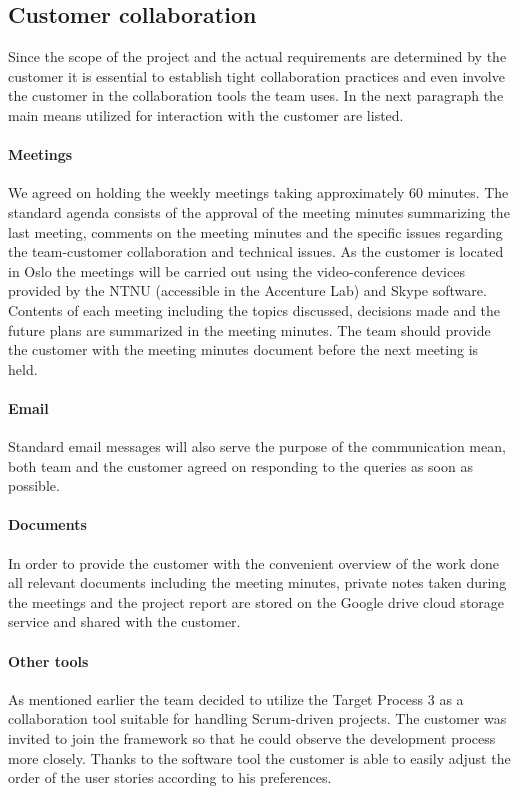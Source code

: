 \documentclass{article}
\begin{document}
\subsection{Customer collaboration}
Since the scope of the project and the actual requirements are determined by the customer it is essential to establish tight collaboration practices and even involve the customer in the collaboration tools the team uses. In the next paragraph the main means utilized for interaction with the customer are listed. 

\paragraph{Meetings}
We agreed on holding the weekly meetings taking approximately 60 minutes. The standard agenda consists of the approval of the meeting minutes summarizing the last meeting, comments on the meeting minutes and the specific issues regarding the team-customer collaboration and technical issues. As the customer is located in Oslo the meetings will be carried out using the video-conference devices provided by the NTNU (accessible in the Accenture Lab) and Skype software. Contents of each meeting including the topics discussed, decisions made and the future plans are summarized in the meeting minutes. The team should provide the customer with the meeting minutes document before the next meeting is held.

\paragraph{Email}
Standard email messages will also serve the purpose of the communication mean, both team and the customer agreed on responding to the queries as soon as possible.

\paragraph{Documents}
In order to provide the customer with the convenient overview of the work done all relevant documents including the meeting minutes, private notes taken during the meetings and the project report are stored on the Google drive cloud storage service and shared with the customer.

\paragraph{Other tools}
As mentioned earlier the team decided to utilize the Target Process 3 as a collaboration tool suitable for handling Scrum-driven projects. The customer was invited to join the framework so that he could observe the development process more closely. Thanks to the software tool the customer is able to easily adjust the order of the user stories according to his preferences.
\end{document}

